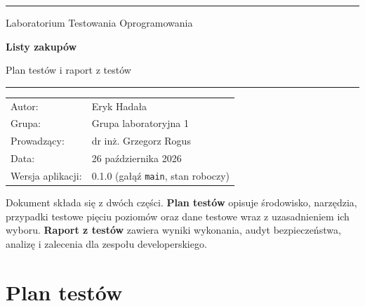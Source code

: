\documentclass[a4paper,11pt]{article}
\newcommand{\autor}{Eryk Hadała}
\newcommand{\grupa}{Grupa laboratoryjna 1}
\newcommand{\prowadzacy}{dr inż. Grzegorz Rogus}
\newcommand{\datadokumentu}{26 października 2026}
\newcommand{\code}[1]{\texttt{\small #1}}
\begin{document}
\hypersetup{pageanchor=false}
\begin{titlepage}
  \sffamily
  \vspace*{2.5cm}
  {\color{accent}\rule{\linewidth}{1.2pt}}\par\vspace{0.8cm}
  {\large\color{muted} Laboratorium Testowania Oprogramowania}\par\vspace{0.5cm}
  {\fontsize{30}{36}\selectfont\bfseries\color{accent} Listy zakupów}\par\vspace{0.4cm}
  {\LARGE Plan testów i raport z testów}\par\vspace{0.8cm}
  {\color{accent}\rule{\linewidth}{1.2pt}}\par
  \vspace{1.2cm}
  \begin{tabular}{@{}ll@{}}
    \textcolor{muted}{Autor:} & \autor \\
    \textcolor{muted}{Grupa:} & \grupa \\
    \textcolor{muted}{Prowadzący:} & \prowadzacy \\
    \textcolor{muted}{Data:} & \datadokumentu \\
    \textcolor{muted}{Wersja aplikacji:} & 0.1.0 (gałąź \code{main}, stan roboczy)
  \end{tabular}
  \vfill
  \begin{tcolorbox}[colback=accentlight,colframe=accentlight,arc=2pt,left=10pt,right=10pt]
    \small
    Dokument składa się z dwóch części. \textbf{Plan testów} opisuje środowisko, narzędzia,
    przypadki testowe pięciu poziomów oraz dane testowe wraz z uzasadnieniem ich wyboru.
    \textbf{Raport z testów} zawiera wyniki wykonania, audyt bezpieczeństwa, analizę
    i zalecenia dla zespołu developerskiego.
  \end{tcolorbox}
\end{titlepage}
\hypersetup{pageanchor=true}

\tableofcontents
\clearpage

\part{Plan testów}
\end{document}
